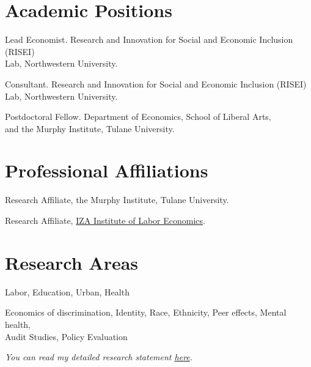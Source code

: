 \documentclass[letterpaper]{article}
\renewenvironment{itemize}{
  \begin{list}{}{
    \setlength{\leftmargin}{1.5em}
  }
}{
  \end{list}
}
\begin{document}
\section*{Academic Positions}
\vspace{2 mm}
\begin{itemize}
  \item {} Lead Economist. Research and Innovation for Social and Economic Inclusion (RISEI) \\{\makebox[1.8cm]{\hfill}} Lab, Northwestern University.
  \item {} Consultant. Research and Innovation for Social and Economic Inclusion (RISEI) \\{\makebox[1.8cm]{\hfill}} Lab, Northwestern University.
  \item {} Postdoctoral Fellow. Department of Economics, School of Liberal Arts, \\{\makebox[1.8cm]{\hfill}} and the Murphy Institute, Tulane University.
\end{itemize}
\vspace{2 mm}

\section*{Professional Affiliations}
\vspace{2 mm}
\begin{itemize}
  \item {} Research Affiliate, the Murphy Institute, Tulane University.
  \item {} Research Affiliate, \href{https://www.iza.org/person/34828/hussain-hadah}{IZA Institute of Labor Economics}.
\end{itemize}
\vspace{2 mm}

\section*{Research Areas}
\vspace{2 mm}
\begin{itemize}
\item {} Labor, Education, Urban, Health
\item {} Economics of discrimination, Identity, Race, Ethnicity, Peer effects, Mental health, \\{\makebox[2.5cm]{\hfill}} Audit Studies, Policy Evaluation
\item \textit{You can read my detailed research statement \href{https://hhadah.github.io/statements/Hadah_Research.pdf}{here}.}
\end{itemize}
\vspace{2 mm}
\end{document}
